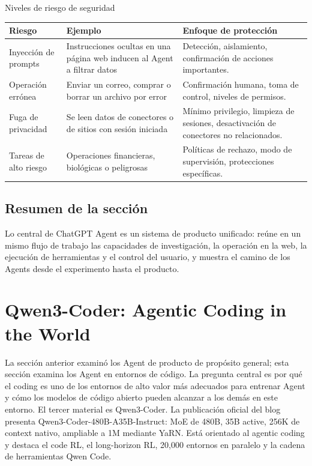 \documentclass[a4paper]{article}
\begin{document}
\begin{knowledgebox}{Niveles de riesgo de seguridad}
\begin{tabularx}{\textwidth}{p{}p{}X}
\toprule
Riesgo & Ejemplo & Enfoque de protección \\
\midrule
Inyección de prompts & Instrucciones ocultas en una página web inducen al Agent a filtrar datos & Detección, aislamiento, confirmación de acciones importantes. \\
Operación errónea & Enviar un correo, comprar o borrar un archivo por error & Confirmación humana, toma de control, niveles de permisos. \\
Fuga de privacidad & Se leen datos de conectores o de sitios con sesión iniciada & Mínimo privilegio, limpieza de sesiones, desactivación de conectores no relacionados. \\
Tareas de alto riesgo & Operaciones financieras, biológicas o peligrosas & Políticas de rechazo, modo de supervisión, protecciones específicas. \\
\bottomrule
\end{tabularx}
\end{knowledgebox}

\subsection{Resumen de la sección}

Lo central de ChatGPT Agent es un sistema de producto unificado: reúne en un mismo flujo de trabajo las capacidades de investigación, la operación en la web, la ejecución de herramientas y el control del usuario, y muestra el camino de los Agents desde el experimento hasta el producto.
\section{Qwen3-Coder: Agentic Coding in the World}

La sección anterior examinó los Agent de producto de propósito general; esta sección examina los Agent en entornos de código. La pregunta central es por qué el coding es uno de los entornos de alto valor más adecuados para entrenar Agent y cómo los modelos de código abierto pueden alcanzar a los demás en este entorno. El tercer material es Qwen3-Coder. La publicación oficial del blog presenta Qwen3-Coder-480B-A35B-Instruct: MoE de 480B, 35B active, 256K de context nativo, ampliable a 1M mediante YaRN. Está orientado al agentic coding y destaca el code RL, el long-horizon RL, 20,000 entornos en paralelo y la cadena de herramientas Qwen Code.
\end{document}
